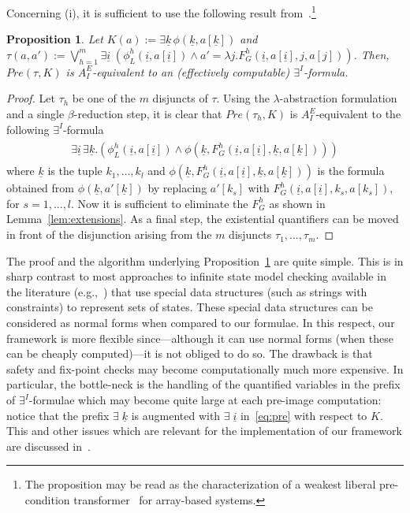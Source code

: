 \documentclass{LMCS}
\newcommand{\ui}{\ensuremath{\underline i}}
\newcommand{\uk}{\ensuremath{\underline k}}
\theoremstyle{plain}\newtheorem{assumption}[thm]{Assumption}
\theoremstyle{plain}\newtheorem{proposition}[thm]{Proposition}
\theoremstyle{plain}\newtheorem{property}[thm]{Property}
\theoremstyle{plain}\newtheorem{example}[thm]{Example}
\theoremstyle{plain}\newtheorem{claim}[thm]{Claim}
\theoremstyle{plain}\newtheorem{lemma}[thm]{Lemma}
\begin{document}
Concerning (i), it is sufficient to use the following result
from~\cite{avocs08}.\footnote{The proposition may be read as the
  characterization of a weakest liberal pre-condition
  transformer~\cite{wlp} for array-based systems.}
\begin{proposition}
  \label{prop:trans}
  Let $K(a):=\exists \uk \, \phi(\uk, a[\uk])$
and $\tau(a,a'):=\bigvee_{h=1}^m\exists \ui \;(\phi^h_L(\ui,
  a[\ui])\wedge a'=\lambda j. F^h_G(\ui, a[\ui], j, a[j]) )$.
Then, $Pre(\tau, K)$ is $A_I^E$-equivalent to an (effectively
  computable) $\exists^I$-formula.
\end{proposition}
\begin{proof}
  Let $\tau_h$ be one of the $m$ disjuncts of $\tau$. Using the
  $\lambda$-abstraction formulation and a single $\beta$-reduction
  step, it is clear that $Pre(\tau_h, K)$ is $A_I^E$-equivalent to the
  following $\exists^I$-formula
\begin{eqnarray}
    \label{eq:pre}
    \begin{array}{r}
      \exists \ui\, \exists \uk.(
      \phi^h_L(\ui, a[\ui]) \wedge \phi(\uk, F_G^h(\ui,a[\ui],\uk, a[\uk])))
    \end{array}
  \end{eqnarray}
  where $\uk$ is the tuple $k_1, \dots, k_l$ and $\phi(\uk,
  F_G^h(\ui,a[\ui],\uk, a[\uk]))$ is the formula obtained from
  $\phi(\uk, a'[\uk])$ by replacing $a'[k_s]$ with
  $F_G^h(\ui,a[\ui],k_s, a[k_s])$, for $s=1, ..., l$.  Now it is
  sufficient to eliminate the $F^h_G$ as shown in
  Lemma~\ref{lem:extensions}. As a final step, the existential
  quantifiers can be moved in front of the disjunction arising from
  the $m$ disjuncts $\tau_1, ..., \tau_m$.
\end{proof}
The proof and the algorithm underlying Proposition~\ref{prop:trans}
are quite simple.  This is in sharp contrast to most approaches to
infinite state model checking available in the literature
(e.g.,~\cite{tacas06,cav06}) that use special data structures (such as
strings with constraints) to represent sets of states. These special
data structures can be considered as normal forms when compared to our
formulae.  In this respect, our framework is more flexible
since---although it can use normal forms (when these can be cheaply
computed)---it is not obliged to do so.
The drawback is that safety and fix-point checks may become
computationally much more expensive.  In particular, the bottle-neck
is the handling of the quantified variables in the prefix of
$\exists^I$-formulae which may become quite large at each pre-image
computation: notice that the prefix $\exists\;\uk$ is augmented with
$\exists\;\ui$ in~\eqref{eq:pre} with respect to $K$.  This and other
issues which are relevant for the implementation of our framework are
discussed in~\cite{avocs08,afm09,ijcar10}.
\end{document}
